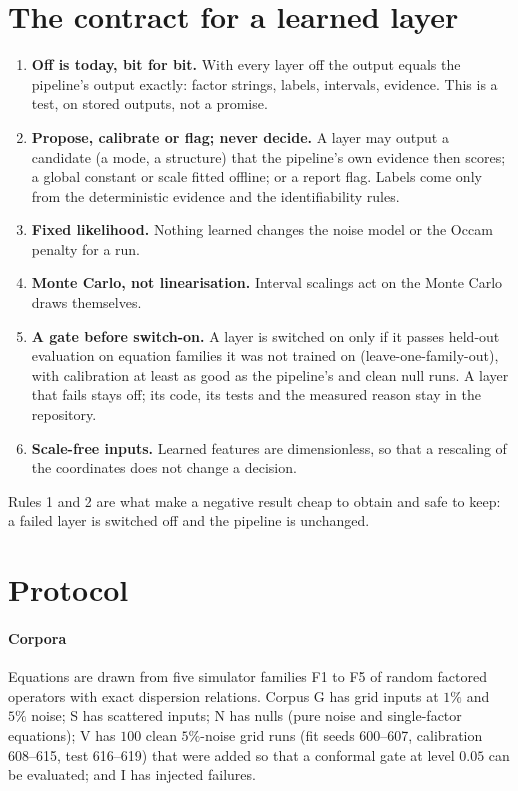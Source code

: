 \section{The contract for a learned layer}\label{sec:contract}
\begin{enumerate}
\item \textbf{Off is today, bit for bit.} With every layer off the output equals the pipeline's output exactly: factor
  strings, labels, intervals, evidence. This is a test, on stored outputs, not a promise.
\item \textbf{Propose, calibrate or flag; never decide.} A layer may output a candidate (a mode, a structure) that the
  pipeline's own evidence then scores; a global constant or scale fitted offline; or a report flag. Labels come only from the
  deterministic evidence and the identifiability rules.
\item \textbf{Fixed likelihood.} Nothing learned changes the noise model or the Occam penalty for a run.
\item \textbf{Monte Carlo, not linearisation.} Interval scalings act on the Monte Carlo draws themselves.
\item \textbf{A gate before switch-on.} A layer is switched on only if it passes held-out evaluation on equation families it
  was not trained on (leave-one-family-out), with calibration at least as good as the pipeline's and clean null runs.
  A layer that fails stays off; its code, its tests and the measured reason stay in the repository.
\item \textbf{Scale-free inputs.} Learned features are dimensionless, so that a rescaling of the coordinates does not change a decision.
\end{enumerate}
Rules 1 and 2 are what make a negative result cheap to obtain and safe to keep: a failed layer is switched off and the
pipeline is unchanged.

\section{Protocol}\label{sec:protocol}
\paragraph{Corpora} Equations are drawn from five simulator families F1 to F5 of random factored operators with exact
dispersion relations. Corpus G has grid inputs at $1\%$ and $5\%$ noise; S has scattered inputs; N has nulls (pure noise and
single-factor equations); V has $100$ clean $5\%$-noise grid runs (fit seeds 600--607, calibration 608--615, test 616--619) that were
added so that a conformal gate at level $0.05$ can be evaluated; and I has injected failures.

